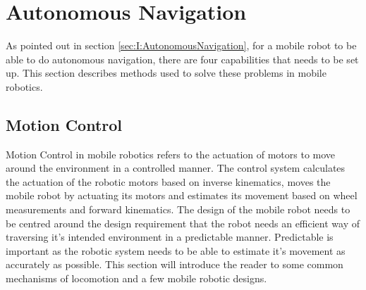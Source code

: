 \section{Autonomous Navigation} \label{sec:T:AutonomousNavigation}
As pointed out in section \ref{sec:I:AutonomousNavigation}, for a mobile robot to be able to do autonomous navigation, there are four capabilities that needs to be set up. This section describes methods used to solve these problems in mobile robotics.


\subsection{Motion Control}\label{sec:T:AN:MotionControl}
Motion Control in mobile robotics refers to the actuation of motors to move  around the environment in a controlled manner. The control system calculates the actuation of the robotic motors based on inverse kinematics, moves the mobile robot by actuating its motors and estimates its movement based on wheel measurements and forward kinematics.
The design of the mobile robot needs to be centred around the design requirement that the robot needs an efficient way of traversing it's intended environment in a predictable manner. Predictable is important as the robotic system needs to be able to estimate it's movement as accurately as possible. This section will introduce the reader to some common mechanisms of locomotion and a few mobile robotic designs.

